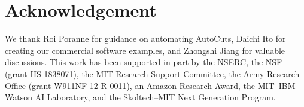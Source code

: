 
\section*{Acknowledgement}
We thank Roi Poranne for guidance on automating AutoCuts, Daichi Ito for creating our commercial software examples, and Zhongshi Jiang for valuable discussions.
This work has been supported in part by the NSERC, the NSF (grant IIS-1838071), the MIT Research Support Committee, the Army Research Office (grant W911NF-12-R-0011), an Amazon Research Award, the MIT--IBM Watson AI Laboratory, and the Skoltech--MIT Next Generation Program.

